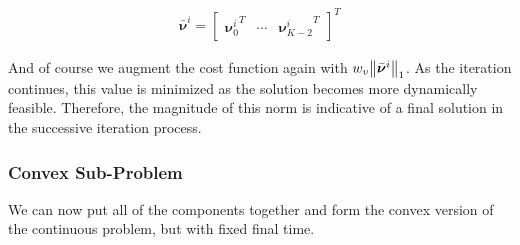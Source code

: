 \begin{align}
\bar{\bm{\nu}}^i = 
	\begin{bmatrix}
	{\bm{\nu}_0^i}^T & \cdots & {\bm{\nu}^i_{K-2}}^T 
	\end{bmatrix}^T
\end{align}

And of course we augment the cost function again with $w_v \norm{\bar{\bm{\nu}}^i}_1$. As the iteration continues, this value is minimized as the solution becomes more dynamically feasible. Therefore, the magnitude of this norm is indicative of a final solution in the successive iteration process.

\clearpage
\subsubsection{Convex Sub-Problem}
We can now put all of the components together and form the convex version of the continuous problem, but with fixed final time.

